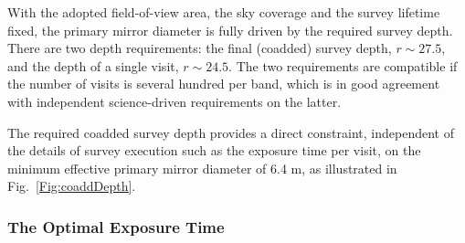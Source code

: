 With the adopted field-of-view area, the sky coverage and the survey lifetime
fixed, the primary mirror diameter is fully driven by the required survey
depth. There are two depth requirements: the final (coadded) survey depth,
$r\sim27.5$, and the depth of a single visit, $r\sim24.5$. The two
requirements are compatible if the number of visits is several hundred
per band, which is in good agreement with independent science-driven
requirements on the latter.

The required coadded survey depth provides a direct constraint,
independent of the details of survey execution such as the exposure time per visit,
on the minimum effective primary mirror diameter of 6.4 m, as illustrated in
Fig.~\ref{Fig:coaddDepth}.



\subsubsection{The Optimal Exposure Time }

